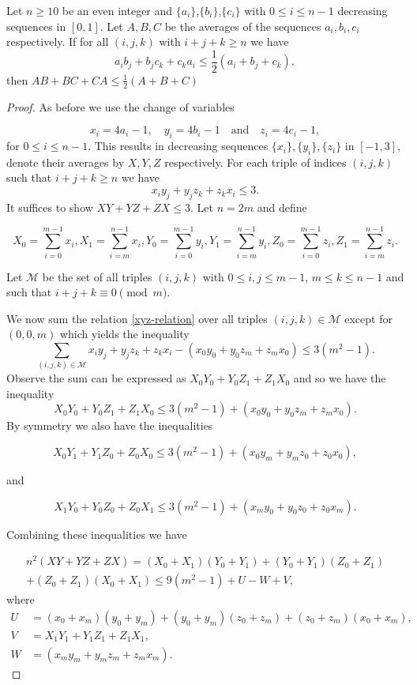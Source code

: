\documentclass[10pt,a4paper]{amsart}
\begin{document}
\begin{lemma}\label{asymmetric-lemma}
Let $n \geq 10$ be an even integer and $\{a_i\}$,$\{b_i\}$,$\{c_i\}$ with $0 \leq i \leq n-1$ decreasing sequences in $[0,1]$.  Let $A,B,C$ be the averages of the sequences $a_i,b_i,c_i$ respectively. If for all $(i,j,k)$ with $i+j + k \geq n $ we have $$a_ib_j + b_jc_k + c_ka_i \leq \frac{1}{2}(a_i + b_j + c_k),$$ then $AB + BC + CA \leq \frac{1}{2}(A+B+C)$
\end{lemma}

\begin{proof}
As before we use the change of variables

\[
x_i = 4a_i - 1, \quad y_i = 4b_i - 1 \quad \textrm{and} \quad z_i = 4c_i - 1,
\]
 for $0 \leq i \leq n-1.$ This results in decreasing sequences $\{x_i\}, \{y_i\},\{z_i\}$ in $[-1,3]$, denote their averages by $X,Y,Z$ respectively. For each triple of indices $(i,j,k)$ such that $i + j + k \geq n$ we have \begin{equation}
    x_iy_j + y_jz_k + z_kx_i \leq 3. \label{xyz-relation}
\end{equation} It suffices to show $XY + YZ + ZX \leq 3.$ Let $n = 2m$ and define 

\[
X_0 = \sum_{i=0}^{m-1}x_i, X_1 = \sum_{i=m}^{n-1}x_i , Y_0 = \sum_{i=0}^{m-1}y_i, Y_1 = \sum_{i=m}^{n-1}y_i, Z_0 = \sum_{i=0}^{m-1}z_i, Z_1 = \sum_{i=m}^{n-1}z_i.
\]

Let $\mathcal{M}$ be the set of all triples $(i,j,k)$ with $0 \leq i,j \leq m-1$, $m \leq k \leq n-1$ and such that $i + j + k \equiv 0 \pmod{m}.$

 We now sum the relation \eqref{xyz-relation} over all triples $(i,j,k) \in \mathcal{M}$ except for $(0,0,m)$ which yields the inequality $$\sum_{(i,j,k) \in \mathcal{M}}x_iy_j + y_jz_k + z_kx_i - (x_0y_0 + y_0z_m + z_mx_0) \leq 3(m^2-1).$$ Observe the sum can be expressed as $X_0Y_0 + Y_0Z_1 + Z_1X_0$ and so we have the inequality $$X_0Y_0 + Y_0Z_1 + Z_1X_0 \leq 3(m^2-1) + (x_0y_0 + y_0z_m + z_mx_0).$$ By symmetry we also have the inequalities 
 
 $$X_0Y_1 + Y_1Z_0 + Z_0X_0 \leq 3(m^2-1) + (x_0y_m + y_mz_0 + z_0x_0),$$

 and

 $$X_1Y_0 + Y_0Z_0 + Z_0X_1 \leq 3(m^2-1) + (x_my_0 + y_0z_0 + z_0x_m).$$

Combining these inequalities we have


\begin{multline*}
n^2(XY + YZ + ZX) = (X_0+X_1)(Y_0 +Y_1) + (Y_0 + Y_1)(Z_0 + Z_1)  \\ + (Z_0 + Z_1)(X_0 + X_1)  \leq 9(m^2-1) + U  - W + V,
\end{multline*}
where
\begin{align*}
    U &= (x_0 + x_m)(y_0 + y_m) + (y_0 + y_m)(z_0 + z_m) + (z_0 + z_m)(x_0 + x_m), \\
    V &= X_1Y_1 + Y_1Z_1 + Z_1X_1, \\
    W &= (x_my_m + y_mz_m + z_mx_m).
\end{align*}


\end{proof}
\end{document}
